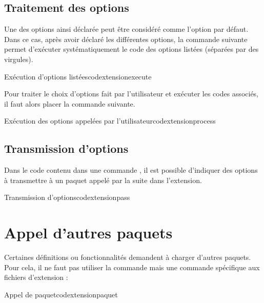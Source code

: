 \subsection{Traitement des options}

Une des options ainsi déclarée peut être considéré comme l'option par défaut. Dans ce cas, après avoir déclaré les différentes options, la commande suivante permet d'exécuter systématiquement le code des options listées (séparées par des virgules). 

\begin{codesimple}{Exécution d'options listées}{codextensionexecute}
\end{codesimple}

Pour traiter le choix d'options fait par l'utilisateur et exécuter les codes associés, il faut alors placer la commande suivante.

\begin{codesimple}{Exécution des options appelées par l'utilisateur}{codextensionprocess}
\ProcessOptions \relax
\end{codesimple}

\subsection{Transmission d'options}

Dans le code contenu dans une commande , il est possible d'indiquer des options à transmettre à un paquet appelé par la suite dans l'extension. 

\begin{codesimple}{Transmission d'options}{codextensionpass}
\end{codesimple}

\section{Appel d'autres paquets}

Certaines définitions ou fonctionnalités demandent à charger d'autres paquets. Pour cela, il ne faut pas utiliser la commande  mais une commande spécifique aux fichiers d'extension : 

\begin{codesimple}{Appel de paquet}{codextensionpaquet}
\end{codesimple}


